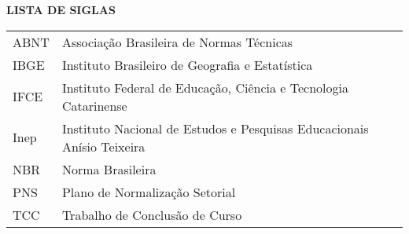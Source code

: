 \begin{center}
\textbf{LISTA DE SIGLAS}
\end{center}
\vspace*{0.5cm}
\begin{tabular}{ll}
ABNT & Associação Brasileira de Normas Técnicas \\
IBGE & Instituto Brasileiro de Geografia e Estatística \\
IFCE & Instituto Federal de Educação, Ciência e Tecnologia Catarinense \\
Inep & Instituto Nacional de Estudos e Pesquisas Educacionais Anísio Teixeira \\
NBR & Norma Brasileira \\
PNS & Plano de Normalização Setorial \\
TCC & Trabalho de Conclusão de Curso \\
\end{tabular}
\addtocounter{table}{0}